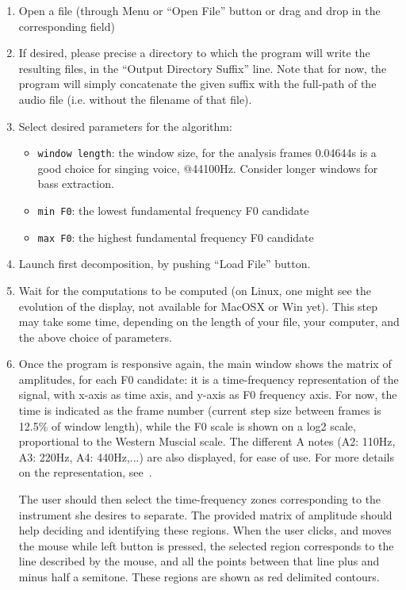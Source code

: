 \documentclass{article}
\begin{document}
\begin{enumerate}
\item Open a file (through Menu or ``Open File'' button or drag and drop
                in the corresponding field)

\item If desired, please precise a directory to which the program will write
   the resulting files, in the ``Output Directory Suffix'' line. 
   Note that for now, the program will simply concatenate the given suffix
   with the full-path of the audio file (i.e. without the filename of that 
   file). 

\item Select desired parameters for the algorithm:
\begin{itemize}
\item \texttt{window length}: the window size, for the analysis frames
        0.04644s is a good choice for singing voice, @44100Hz.
        Consider longer windows for bass extraction.
\item \texttt{min F0}: the lowest fundamental frequency F0 candidate
\item \texttt{max F0}: the highest fundamental frequency F0 candidate
\end{itemize}

\item Launch first decomposition, by pushing ``Load File'' button.

\item Wait for the computations to be computed (on Linux, one might
   see the evolution of the display, not available for MacOSX or Win yet). This step may take some time, depending on the length of your file, your computer, and the above choice of parameters.

\item Once the program is responsive again, the main window shows the matrix
   of amplitudes, for each F0 candidate: it is a time-frequency representation
   of the signal, with x-axis as time axis, and y-axis as F0 frequency axis.
   For now, the time is indicated as the frame number (current step size
   between frames is 12.5\% of window length), while the F0 scale is shown 
   on a log2 scale, proportional to the Western Muscial scale. The different
   A notes (A2: 110Hz, A3: 220Hz, A4: 440Hz,...) are also displayed, for
   ease of use. For more details on the representation, see~\cite{Durrieu2011}.
   
   The user should then select the time-frequency zones corresponding to
   the instrument she desires to separate. The provided matrix of amplitude
   should help deciding and identifying these regions. When the user clicks,
   and moves the mouse while left button is pressed, the selected region
   corresponds to the line described by the mouse, and all the points
   between that line plus and minus half a semitone. These regions are 
   shown as red delimited contours.
   

\end{enumerate}
\end{document}
